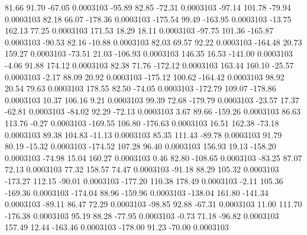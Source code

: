        81.66       91.70      -67.05     0.0003103
      -95.89       82.85      -72.31     0.0003103
      -97.14      101.78      -79.94     0.0003103
       82.18       66.07     -178.36     0.0003103
     -175.54       99.49     -163.95     0.0003103
      -13.75      162.13       77.25     0.0003103
      171.53       18.29       18.11     0.0003103
      -97.75      101.36     -165.87     0.0003103
      -90.53       82.16      -10.88     0.0003103
       82.03       69.57       92.22     0.0003103
     -164.48       20.73      159.27     0.0003103
      -73.51       21.03     -106.93     0.0003103
      146.35       16.53     -141.00     0.0003103
       -4.06       91.88      174.12     0.0003103
       82.38       71.76     -172.12     0.0003103
      163.44      160.10      -25.57     0.0003103
       -2.17       88.09       20.92     0.0003103
     -175.12      100.62     -164.42     0.0003103
       98.92       20.54       79.63     0.0003103
      178.55       82.50      -74.05     0.0003103
     -172.79      109.07     -178.86     0.0003103
       10.37      106.16        9.21     0.0003103
       99.39       72.68     -179.79     0.0003103
      -23.57       17.37      -62.81     0.0003103
      -84.02       92.29      -72.13     0.0003103
        3.67       89.66     -159.26     0.0003103
       86.63      113.76       -0.27     0.0003103
     -169.55      106.80     -176.63     0.0003103
       16.51      162.38      -73.18     0.0003103
       89.38      104.83      -11.13     0.0003103
       85.35      111.43      -89.78     0.0003103
       91.79       80.19      -15.32     0.0003103
     -174.52      107.28       96.40     0.0003103
      156.93       19.13     -158.20     0.0003103
      -74.98       15.04      160.27     0.0003103
        0.46       82.80     -108.65     0.0003103
      -83.25       87.07       72.13     0.0003103
       77.32      158.57       74.47     0.0003103
      -91.18       88.29      105.32     0.0003103
     -173.27      112.15      -90.01     0.0003103
     -177.20      110.38      178.49     0.0003103
       -2.11      105.36     -169.36     0.0003103
     -174.04       88.96     -159.96     0.0003103
     -138.04      161.80     -141.34     0.0003103
      -89.11       86.47       72.29     0.0003103
      -98.85       92.88      -67.31     0.0003103
       11.00      111.70     -176.38     0.0003103
       95.19       88.28      -77.95     0.0003103
       -0.73       71.18      -96.82     0.0003103
      157.49       12.44     -163.46     0.0003103
     -178.00       91.23      -70.00     0.0003103
